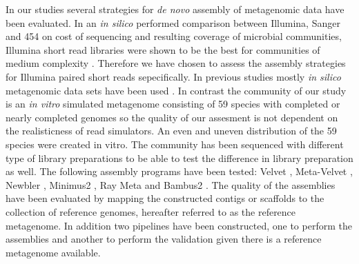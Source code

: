 \documentclass[a4paper,12pt]{report}
\begin{document}

In our studies several strategies for {\em de novo} assembly of metagenomic
data have been evaluated. In an {\em in silico} performed comparison between
Illumina, Sanger and 454 on cost of sequencing and resulting coverage of
microbial communities, Illumina short read libraries were shown to be the best
for communities of medium complexity \cite{Mende22384016}. Therefore we have
chosen to assess the assembly strategies for Illumina paired short reads
sepecifically.  In previous studies mostly {\em in silico} metagenomic data
sets have been used \cite{Pignatelli21625384,Mavromatis17468765}. In contrast
the community of our study is an {\em in vitro} simulated metagenome consisting
of 59 species with completed or nearly completed genomes so the quality of our
assesment is not dependent on the realisticness of read simulators. An even and
uneven distribution of the 59 species were created in vitro. The community has
been sequenced with different type of library preparations to be able to test
the difference in library preparation as well.  The following assembly programs
have been tested: Velvet \cite{Zerbino18349386}, Meta-Velvet \cite{MetaVelvet},
Newbler \cite{Quinn18755037}, Minimus2 \cite{Sommer17324286}, Ray Meta
\cite{Boisvert23259615} and Bambus2 \cite{Koren21926123}. The quality of the
assemblies have been evaluated by mapping the constructed contigs or scaffolds
to the collection of reference genomes, hereafter referred to as the reference
metagenome. In addition two pipelines have been constructed, one to perform the
assemblies and another to perform the validation given there is a reference
metagenome available.
\end{document}
